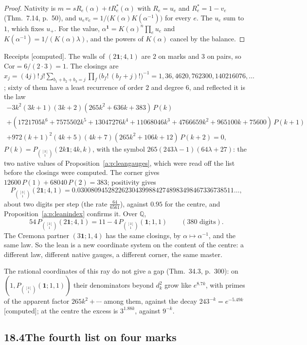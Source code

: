 \documentclass[11pt]{article}
\newcommand{\one}{\mathbf 1}
\newcommand{\Pth}{P_{\binom{[3]}1}(\one;1,1)}
\theoremstyle{plain}
\theoremstyle{definition}
\theoremstyle{remark}
\newcommand{\computed}{\textup{[computed]}}
\begin{document}
\begin{proof}
Nativity is $m=sR_e(\alpha)+tR^\ast_e(\alpha)$ with $R_e=u_e$ and $R^\ast_e=1-v_e$ (Thm.~7.14, p.~50), and $u_ev_e=1/\big(K(\alpha)K(\alpha^{-1})\big)$ for every $e$. The $u_e$ sum to $1$, which fixes $u_+$. For the value, $\alpha^{\one}=K(\alpha)^n\prod_eu_e$ and $K(\alpha^{-1})=1/(K(\alpha)\lambda)$, and the powers of $K(\alpha)$ cancel by the balance.
\end{proof}

\noindent Receipts \computed. The walls of $(2\one;4,1)$ are $2$ on marks and $3$ on pairs, so $\mathrm{Cor}=6/(2\cdot3)=1$. The closings are $x_j=(4j)!\,j!\sum_{b_1+b_2+b_3=j}\prod_f\big(b_f!\,(b_f+j)!\big)^{-1}=1,36,4620,762300,140216076,\dots$; sixty of them have a least recurrence of order $2$ and degree $6$, and reflected it is the law
\begin{gather*}
-3k^2(3k+1)(3k+2)(265k^2+636k+383)\,P(k)\\
+(1721705k^6+7575502k^5+13047276k^4+11068046k^3+4766659k^2+965100k+75600)\,P(k+1)\\
+972(k+1)^2(4k+5)(4k+7)(265k^2+106k+12)\,P(k+2)=0,
\end{gather*}
$P(k)=P_{\binom{[3]}1}(2k\one;4k,k)$, with the symbol $265(243\lambda-1)(64\lambda+27)$: the two native values of Proposition~\ref{a:p:leangauges}, which were read off the list before the closings were computed. The corner gives $12600\,P(1)+68040\,P(2)=383$; positivity gives
\[
P_{\binom{[3]}1}(2\one;4,1)=0.0300809452822623043998842748983498467336738511\ldots,
\]
about two digits per step (the rate $\frac{64}{6561}$), against $0.95$ for the centre, and Proposition~\ref{a:p:leanindex} confirms it. Over $\mathbb Q$,
\[
54\,P_{\binom{[3]}1}(2\one;4,1)=11-4\,\Pth\qquad(380\text{ digits}).
\]
The Cremona partner $(3\one;1,4)$ has the same closings, by $\alpha\mapsto\alpha^{-1}$, and the same law. So the lean is a new coordinate system on the content of the centre: a different law, different native gauges, a different corner, the same master.

The rational coordinates of this ray do not give a gap (Thm.~34.3, p.~300): on $(1,\Pth)$ their denominators beyond $d_k^2$ grow like $e^{8.7k}$, with primes of the apparent factor $265k^2+\cdots$ among them, against the decay $243^{-k}=e^{-5.49k}$ \computed; at the centre the excess is $3^{1.88k}$, against $9^{-k}$.

\subsection*{18.4\quad The fourth list on four marks}
\end{document}
